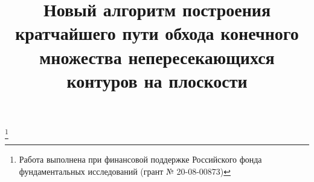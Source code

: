 \documentclass[12pt]{a&t}
\begin{document}
\title{
  Новый алгоритм построения кратчайшего пути обхода
  конечного множества непересекающихся контуров на плоскости
}%
\thanks{
  Работа выполнена при финансовой поддержке
  Российского фонда фундаментальных исследований
  (грант № 20-08-00873)
}


\maketitle
\end{document}
